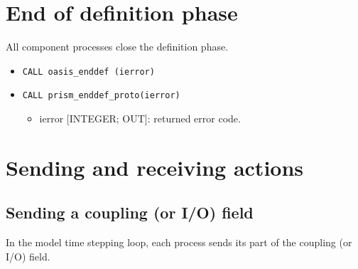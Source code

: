 \section{End of definition phase}
\label{subsubsec_Endofdefinition}
All component processes close the definition phase.
\begin{itemize}
\item {\tt CALL oasis\_enddef       (ierror)}
\item {\tt CALL prism\_enddef\_proto(ierror)}
\begin{itemize}
  \item ierror [INTEGER; OUT]: returned error code.
\end{itemize}
\end{itemize}


\section{Sending and receiving actions}
\label{subsubsec_sendingreceiving}

\subsection{Sending a coupling (or I/O) field}
\label{prismput}

In the model time stepping loop, each process 
sends its part of the coupling (or I/O) field. 

